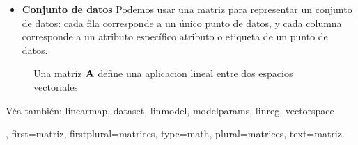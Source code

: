 {{\begin{itemize}
            $$\vu^{(\featureidx)} \mapsto \sum_{\sampleidx=1}^{\samplesize} A_{\sampleidx,\featureidx} \vv^{(\sampleidx)}.$$
            \item {\bf Conjunto de datos} Podemos usar una matriz para representar un conjunto de datos: cada fila 
            corresponde a un único punto de datos, y cada columna corresponde a un atributo específico
            atributo o etiqueta de un punto de datos. 
        \end{itemize}
        \begin{figure}[H]
        \begin{center}
        \end{center}
        \caption{Una matriz ${\bf A}$ define una aplicacion lineal entre dos espacios vectoriales} 
        \end{figure}
        Véa también: \gls{linearmap}, \gls{dataset}, \gls{linmodel}, \glspl{modelparam}, \gls{linreg}, \gls{vectorspace} },
    first={matriz},
    firstplural={matrices},
	type=math,
    plural={matrices},
    text={matriz}
}

